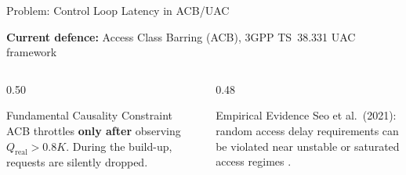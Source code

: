 \documentclass[aspectratio=169,t]{beamer}
\newcommand{\qreal}{Q_{\mathrm{real}}}
\begin{document}
\begin{frame}{Problem: Control Loop Latency in ACB/UAC}

  \textbf{Current defence:} Access Class Barring (ACB), 3GPP TS~38.331 UAC framework

  \vspace{10pt}
  \begin{center}
  \end{center}

  \vspace{6pt}
  \begin{columns}[T]
    \begin{column}{0.50\textwidth}
      \begin{alertblock}{\small Fundamental Causality Constraint}
        \small
        ACB throttles \textbf{only after} observing $\qreal > 0.8K$.
        During the build-up, requests are silently dropped.
      \end{alertblock}
    \end{column}
    \begin{column}{0.48\textwidth}
      \begin{block}{\small Empirical Evidence}
        \small
        Seo et al.\ (2021): random access delay requirements can be violated
        near unstable or saturated access regimes \cite{b6}.
      \end{block}
    \end{column}
  \end{columns}

\end{frame}
\end{document}
